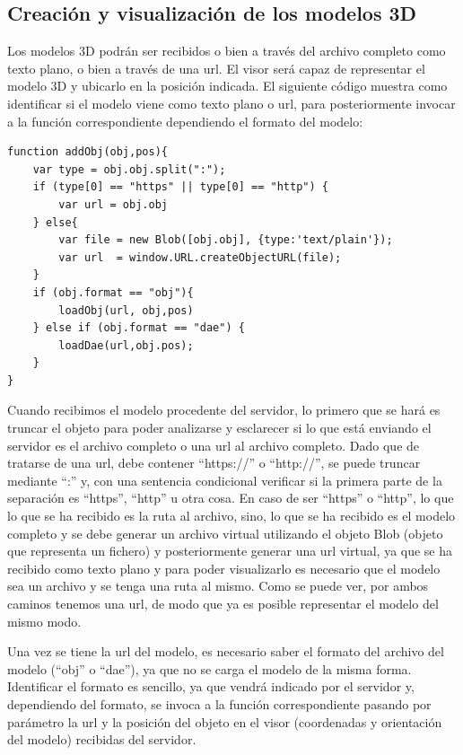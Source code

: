 \subsection{Creación y visualización de los modelos 3D}
Los modelos 3D podrán ser recibidos o bien a través del archivo completo como texto plano, o bien a través de una url. El visor será capaz de representar el modelo 3D y ubicarlo en la posición indicada. El siguiente código muestra como identificar si el modelo viene como texto plano o url, para posteriormente invocar a la función correspondiente dependiendo el formato del modelo:
\begin{lstlisting}[frame=single]
function addObj(obj,pos){
	var type = obj.obj.split(":");
	if (type[0] == "https" || type[0] == "http") {
		var url = obj.obj
	} else{
		var file = new Blob([obj.obj], {type:'text/plain'});
		var url  = window.URL.createObjectURL(file);
	}
	if (obj.format == "obj"){
		loadObj(url, obj,pos)
	} else if (obj.format == "dae") {
		loadDae(url,obj.pos);
	}
}
\end{lstlisting}
Cuando recibimos el modelo procedente del servidor, lo primero que se hará es truncar el objeto para poder analizarse y esclarecer si lo que está enviando el servidor es el archivo completo o una url al archivo completo. Dado que de tratarse de una url, debe contener ``https://'' o ``http://'', se puede truncar mediante ``:'' y, con una sentencia condicional verificar si la primera parte de la separación es ``https'', ``http'' u otra cosa. En caso de ser ``https'' o ``http'', lo que lo que se ha recibido es la ruta al archivo, sino, lo que se ha recibido es el modelo completo y se debe generar un archivo virtual utilizando el objeto Blob (objeto que representa un fichero) y posteriormente generar una url virtual, ya que se ha recibido como texto plano y para poder visualizarlo es necesario que el modelo sea un archivo y se tenga una ruta al mismo. Como se puede ver, por ambos caminos tenemos una url, de modo que ya es posible representar el modelo del mismo modo.

Una vez se tiene la url del modelo, es necesario saber el formato del archivo del modelo (``obj'' o ``dae''), ya que no se carga el modelo de la misma forma. Identificar el formato es sencillo, ya que vendrá indicado por el servidor y, dependiendo del formato, se invoca a la función correspondiente pasando por parámetro la url y la posición del objeto en el visor (coordenadas y orientación del modelo) recibidas del servidor.


